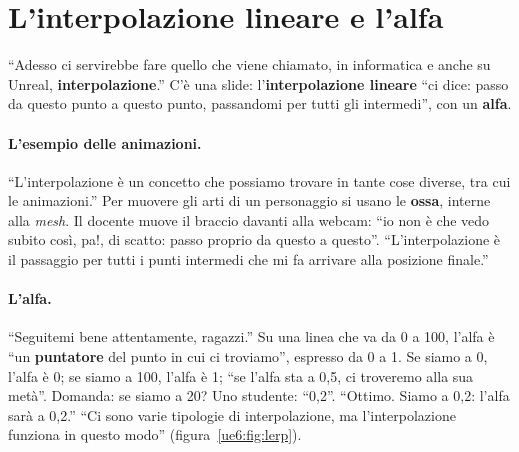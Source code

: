 \section{L'interpolazione lineare e l'alfa}
\label{ue6:sec:lerp}

``Adesso ci servirebbe fare quello che viene chiamato, in informatica e anche su Unreal,
\textbf{interpolazione}.'' C'è una slide: l'\textbf{interpolazione lineare} ``ci dice:
passo da questo punto a questo punto, passandomi per tutti gli intermedi'', con un
\textbf{alfa}.

\paragraph{L'esempio delle animazioni.} ``L'interpolazione è un concetto che possiamo
trovare in tante cose diverse, tra cui le animazioni.'' Per muovere gli arti di un
personaggio si usano le \textbf{ossa}, interne alla \emph{mesh}. Il docente muove il
braccio davanti alla webcam: ``io non è che vedo subito così, pa!, di scatto: passo
proprio da questo a questo''. ``L'interpolazione è il passaggio per tutti i punti
intermedi che mi fa arrivare alla posizione finale.''

\paragraph{L'alfa.} ``Seguitemi bene attentamente, ragazzi.'' Su una linea che va da 0 a
100, l'alfa è ``un \textbf{puntatore} del punto in cui ci troviamo'', espresso da 0 a 1.
Se siamo a 0, l'alfa è 0; se siamo a 100, l'alfa è 1; ``se l'alfa sta a 0,5, ci
troveremo alla sua metà''. Domanda: se siamo a 20? Uno studente: ``0,2''. ``Ottimo. Siamo
a 0,2: l'alfa sarà a 0,2.'' ``Ci sono varie tipologie di interpolazione, ma
l'interpolazione funziona in questo modo'' (figura~\ref{ue6:fig:lerp}).

